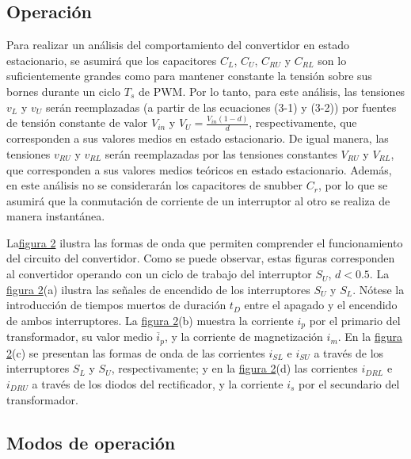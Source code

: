 \subsection{Operación}

Para realizar un análisis del comportamiento del convertidor en estado estacionario, se asumirá que los capacitores \( C_L \), \( C_U \), \( C_{RU} \) y \( C_{RL} \) son lo suficientemente grandes como para mantener constante la tensión sobre sus bornes durante un ciclo \( T_s \) de PWM. Por lo tanto, para este análisis, las tensiones \( v_L \) y \( v_U \) serán reemplazadas (a partir de las ecuaciones (3-1) y (3-2)) por fuentes de tensión constante de valor \( V_{in} \) y \( V_U = \frac{V_{in}(1 - d)}{d} \), respectivamente, que corresponden a sus valores medios en estado estacionario. De igual manera, las tensiones \( v_{RU} \) y \( v_{RL} \) serán reemplazadas por las tensiones constantes \( V_{RU} \) y \( V_{RL} \), que corresponden a sus valores medios teóricos en estado estacionario. Además, en este análisis no se considerarán los capacitores de snubber \( C_r \), por lo que se asumirá que la conmutación de corriente de un interruptor al otro se realiza de manera instantánea.

La\hyperref[fig:formaonda1]{figura 2} ilustra las formas de onda que permiten comprender el funcionamiento del circuito del convertidor. Como se puede observar, estas figuras corresponden al convertidor operando con un ciclo de trabajo del interruptor \( S_U \), \( d < 0.5 \). La \hyperref[fig:formaonda1]{figura 2}(a) ilustra las señales de encendido de los interruptores \( S_U \) y \( S_L \). Nótese la introducción de tiempos muertos de duración \( t_D \) entre el apagado y el encendido de ambos interruptores. La \hyperref[fig:formaonda1]{figura 2}(b) muestra la corriente \( i_p \) por el primario del transformador, su valor medio \( \overline{i}_p \), y la corriente de magnetización \( i_m \). En la \hyperref[fig:formaonda1]{figura 2}(c) se presentan las formas de onda de las corrientes \( i_{SL} \) e \( i_{SU} \) a través de los interruptores \( S_L \) y \( S_U \), respectivamente; y en la \hyperref[fig:formaonda1]{figura 2}(d) las corrientes \( i_{DRL} \) e \( i_{DRU} \) a través de los diodos del rectificador, y la corriente \( i_s \) por el secundario del transformador.

\subsection{Modos de operación}

